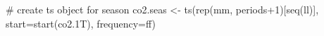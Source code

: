 \begin{Schunk}
\begin{Sinput}
 # create ts object for season
 co2.seas <- ts(rep(mm, periods+1)[seq(ll)],
                start=start(co2.1T), 
                frequency=ff)
\end{Sinput}
\end{Schunk}
